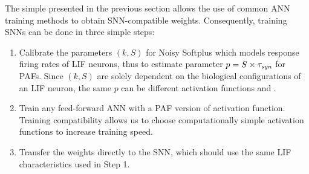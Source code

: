 	The simple \DIFdelbegin {}\DIFdelend \DIFaddbegin {}\DIFaddend presented in the previous section allows the use of common ANN training methods to obtain SNN-compatible weights.
	Consequently, training SNNs can be done in three simple steps: 
	\begin{enumerate}
		\item Calibrate the parameters $(k, S)$ for Noisy Softplus which models \DIFaddbegin {}\DIFaddend response firing rates of LIF neurons, thus to estimate \DIFaddbegin {}\DIFaddend parameter $p=S \times \tau_{\textit{\textrm{syn}}}$ for PAFs. Since $(k, S)$ are solely dependent on the biological configurations of an LIF neuron, the same $p$ can be \DIFdelbegin {}\DIFdelend \DIFaddbegin {}\DIFaddend different activation functions and \DIFdelbegin {}\DIFdelend \DIFaddbegin {}\DIFaddend .
		\item Train any feed-forward ANN with a PAF version of \DIFdelbegin {}\DIFdelend \DIFaddbegin {}\DIFaddend activation function.
		Training compatibility allows us to choose computationally simple activation functions to increase training speed.
		\item Transfer the weights directly to the SNN, which should use the same LIF characteristics used in Step 1.
	\end{enumerate}

